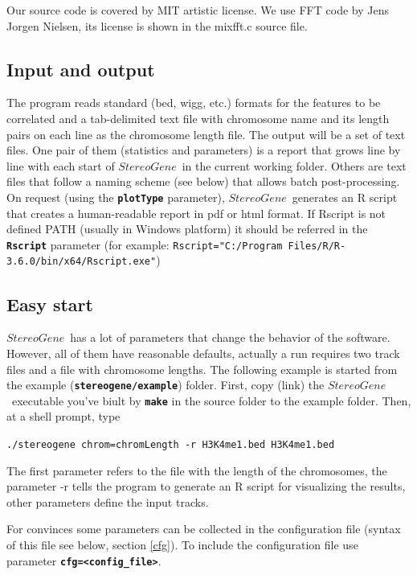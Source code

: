 \documentclass{article}
\newcommand{\prm}[1]{\texttt{\textbf{{#1}}}}
\newcommand{\sg}{$StereoGene$\ }
\begin{document}
Our source code is covered by MIT artistic license. We use FFT code by Jens Jorgen Nielsen, its license is shown in the mixfft.c source file.

\subsection{Input and output}
The program reads standard (bed, wigg, etc.) formats for the features to be correlated and a tab-delimited text file with chromosome name and its length pairs on each line as the chromosome length file. The output will be a set of text files. One pair of them (statistics and parameters) is a report that grows line by line with each start of \sg in the current working folder. Others are text files that follow a naming scheme (see below) that allows batch post-processing. On request (using the \prm{plotType} parameter), \sg generates an R script that creates a human-readable report in pdf or html format. If Rscript is not defined PATH (usually in Windows platform) it should be referred in the \prm{Rscript} parameter (for example: \texttt{Rscript="C:/Program Files/R/R-3.6.0/bin/x64/Rscript.exe"})
\subsection{Easy start}
\sg has a lot of parameters that change the behavior of the software.  However, all of them have reasonable defaults, actually a run requires two track files and a file with chromosome lengths. The following example is started from the example (\prm{stereogene/example}) folder. First, copy (link) the \sg executable you've biult by \prm{make} in the source folder to the example folder. Then, at a shell prompt, type \vspace{0.5cm}

\begin{center}
\texttt{./stereogene chrom=chromLength -r H3K4me1.bed H3K4me1.bed}\vspace{0.5cm}
\end{center}

The first parameter refers to the file with the length of the chromosomes, the parameter -r tells the program to generate an R script for visualizing the results, other parameters define the input tracks.

For convinces some parameters can be collected in the configuration file (syntax of this file see below, section \ref{cfg}).
To include the configuration file use parameter \prm{cfg=<config\_file>}.
\end{document}
